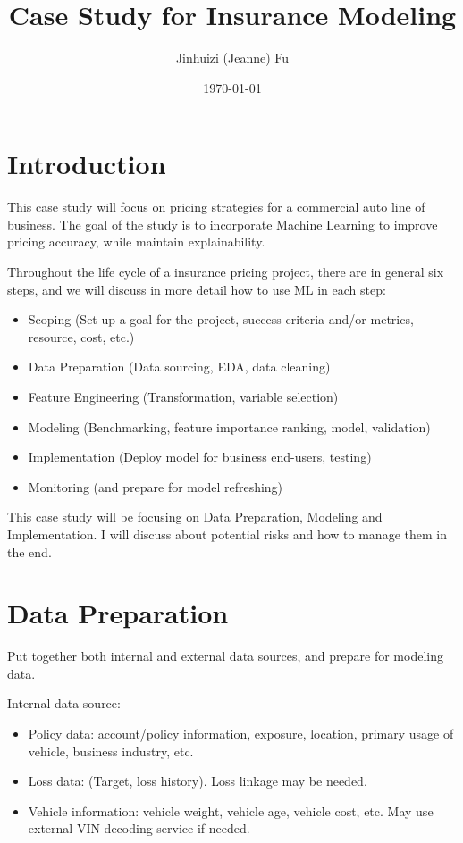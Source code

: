 \documentclass{article}
\title{Case Study for Insurance Modeling}
\author{Jinhuizi (Jeanne) Fu}
\date{\today}
\begin{document}
\maketitle

\section{Introduction}
This case study will focus on pricing strategies for a commercial auto line of business. The goal of the study is to incorporate Machine Learning to improve pricing accuracy, while maintain explainability.

Throughout the life cycle of a insurance pricing project, there are in general six steps, and we will discuss in more detail how to use ML in each step:

\begin{itemize}
    \item Scoping (Set up a goal for the project, success criteria and/or metrics, resource, cost, etc.)
    \item Data Preparation (Data sourcing, EDA, data cleaning)
    \item Feature Engineering (Transformation, variable selection)
    \item Modeling (Benchmarking, feature importance ranking, model, validation)
    \item Implementation (Deploy model for business end-users, testing)
    \item Monitoring (and prepare for model refreshing)
\end{itemize}

This case study will be focusing on Data Preparation, Modeling and Implementation. I will discuss about potential risks and how to manage them in the end.

\section{Data Preparation}
Put together both internal and external data sources, and prepare for modeling data.

Internal data source:
\begin{itemize}
    \item Policy data: account/policy information, exposure, location, primary usage of vehicle, business industry, etc.
    \item Loss data: (Target, loss history). Loss linkage may be needed. 
    \item Vehicle information: vehicle weight, vehicle age, vehicle cost, etc. May use external VIN decoding service if needed.
\end{itemize}
\end{document}
